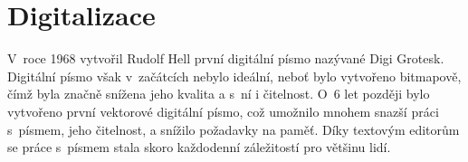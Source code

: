 \documentclass[a4paper, 11pt]{article}
\begin{document}
\section{Digitalizace}
V~roce 1968 vytvořil Rudolf Hell první digitální písmo nazývané Digi Grotesk. Digitální písmo však
v~začátcích nebylo ideální, neboť bylo vytvořeno bitmapově, čímž byla značně snížena jeho kvalita a s~ní 
i čitelnost. O~6 let později bylo vytvořeno první vektorové digitální písmo, což umožnilo mnohem snazší práci
s~písmem, jeho čitelnost, a snížilo požadavky na paměť. Díky textovým editorům se práce s~písmem stala skoro
každodenní záležitostí pro většinu lidí\cite{bigelow1983}\cite{plna2006}.

\newpage

\renewcommand{\refname}{Literatura}

\end{document}
